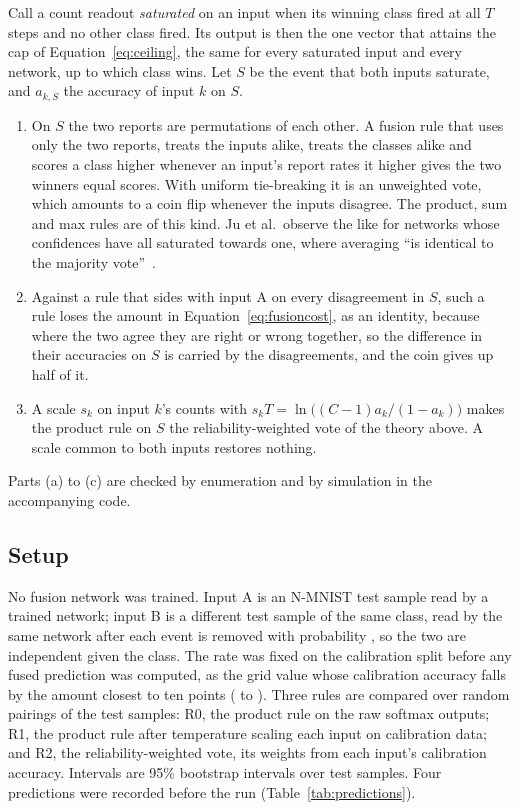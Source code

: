 Call a count readout \emph{saturated} on an input when its winning class fired at all $T$
steps and no other class fired. Its output is then the one vector that attains the cap of
Equation~\eqref{eq:ceiling}, the same for every saturated input and every network, up to which
class wins. Let $S$ be the event that both inputs saturate, and $a_{k,S}$ the accuracy of
input $k$ on $S$.
\begin{enumerate}
\item[(a)] On $S$ the two reports are permutations of each other. A fusion rule that uses only
  the two reports, treats the inputs alike, treats the classes alike and scores a class higher
  whenever an input's report rates it higher gives the two winners equal scores. With uniform
  tie-breaking it is an unweighted vote, which amounts to a coin flip whenever the inputs disagree. The
  product, sum and max rules are of this kind. Ju et al.\ observe the like for networks whose
  confidences have all saturated towards one, where averaging ``is identical to the majority
  vote''~\citep{ju2018relative}. %
\item[(b)] Against a rule that sides with input A on every disagreement in $S$, such a rule
  loses the amount in Equation~\eqref{eq:fusioncost}, as an identity, because where the two agree
  they are right or wrong together, so the difference in their accuracies on $S$ is carried by
  the disagreements, and the coin gives up half of it.
\item[(c)] A scale $s_k$ on input $k$'s counts with
  $s_kT=\ln\big((C-1)a_k/(1-a_k)\big)$ makes the product rule on $S$ the reliability-weighted
  vote of the theory above. A scale common to both inputs restores nothing.
\end{enumerate}
Parts (a) to (c) are checked by enumeration and by simulation in the accompanying code.

\subsection{Setup}
\label{app:fusionsetup}

No fusion network was trained. Input A is an N-MNIST test sample read by a trained network; input B
is a different test sample of the same class, read by the same network after each event is
removed with probability \fuRate, so the two are independent given the class. The rate was %
fixed on the calibration split before any fused prediction was computed, as the grid value
whose calibration accuracy falls by the amount closest to ten points (\fuCalClean{} to \fuCalDropped). %
Three rules are compared over \fuPairings{} random pairings of the \nmSplitTest{} test samples: %
R0, the product rule on the raw softmax outputs; R1, the product rule after temperature scaling
each input on calibration data; and R2, the reliability-weighted vote, its weights from each
input's calibration accuracy. Intervals are 95\% bootstrap intervals over test samples. Four
predictions were recorded before the run (Table~\ref{tab:predictions}).

